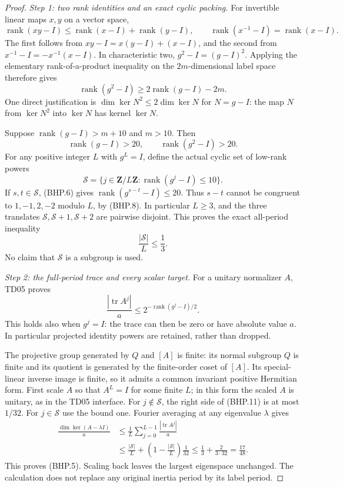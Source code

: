 \begin{proof}
\emph{Step 1: two rank identities and an exact cyclic packing.}
For invertible linear maps \(x,y\) on a vector space,
\[
 \operatorname{rank}(xy-I)
       \le\operatorname{rank}(x-I)+\operatorname{rank}(y-I),
 \qquad
 \operatorname{rank}(x^{-1}-I)=\operatorname{rank}(x-I).
 \tag{BHP.6}
\]
The first follows from \(xy-I=x(y-I)+(x-I)\), and the second
from \(x^{-1}-I=-x^{-1}(x-I)\).
In characteristic two, \(g^2-I=(g-I)^2\).  Applying the elementary
rank-of-a-product inequality on the \(2m\)-dimensional label space
therefore gives
\[
 \operatorname{rank}(g^2-I)
                  \ge2\operatorname{rank}(g-I)-2m.
 \tag{BHP.7}
\]
One direct justification is
\(\dim\ker N^2\le2\dim\ker N\) for \(N=g-I\): the map \(N\)
from \(\ker N^2\) into \(\ker N\) has kernel \(\ker N\).

Suppose \(\operatorname{rank}(g-I)>m+10\) and \(m>10\).
Then
\[
       \operatorname{rank}(g-I)>20,\qquad
       \operatorname{rank}(g^2-I)>20.
 \tag{BHP.8}
\]
For any positive integer \(L\) with \(g^L=I\), define the actual
cyclic set of low-rank powers
\[
       \mathcal S=\{j\in\mathbf Z/L\mathbf Z:
                       \operatorname{rank}(g^j-I)\le10\}.
 \tag{BHP.9}
\]
If \(s,t\in\mathcal S\), (BHP.6) gives
\(\operatorname{rank}(g^{s-t}-I)\le20\).
Thus \(s-t\) cannot be congruent to \(1,-1,2,-2\) modulo \(L\),
by (BHP.8).  In particular \(L\ge3\), and the three translates
\(\mathcal S,\mathcal S+1,\mathcal S+2\) are pairwise disjoint.
This proves the exact all-period inequality
\[
                            \frac{|\mathcal S|}{L}\le\frac13.
 \tag{BHP.10}
\]
No claim that \(\mathcal S\) is a subgroup is used.

\emph{Step 2: the full-period trace and every scalar target.}
For a unitary normalizer \(A\), TD05 proves
\[
 \frac{|\operatorname{tr}A^j|}{a}
 \le 2^{-\operatorname{rank}(g^j-I)/2}.
 \tag{BHP.11}
\]
This holds also when \(g^j=I\): the trace can then be zero or have
absolute value \(a\).  In particular projected identity powers are
retained, rather than dropped.

The projective group generated by \(Q\) and \([A]\) is finite:
its normal subgroup \(Q\) is finite and its quotient is generated by
the finite-order coset of \([A]\).  Its special-linear inverse image
is finite, so it admits a common invariant positive Hermitian form.
First scale \(A\) so that \(A^L=I\) for some finite \(L\); in this
form the scaled \(A\) is unitary, as in the TD05 interface.
For \(j\notin\mathcal S\), the right side of (BHP.11) is at most
\(1/32\).  For \(j\in\mathcal S\) use the bound one.
Fourier averaging at any eigenvalue \(\lambda\) gives
\[
 \begin{split}
 \frac{\dim\ker(A-\lambda I)}a
 &\le\frac1L\sum_{j=0}^{L-1}\frac{|\operatorname{tr}A^j|}{a}\\
 &\le\frac{|\mathcal S|}{L}
                +\left(1-\frac{|\mathcal S|}{L}\right)\frac1{32}
 \le\frac13+\frac{2}{3\cdot32}
 =\frac{17}{48}.
 \end{split}
 \tag{BHP.12}
\]
This proves (BHP.5).  Scaling back leaves the largest eigenspace
unchanged.  The calculation does not replace any original inertia
period by its label period.


\end{proof}
